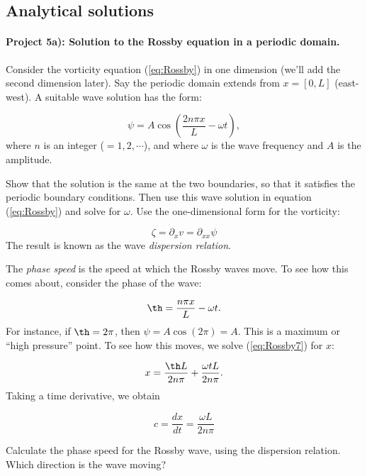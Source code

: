 \documentclass[%
oneside,                 %
final,                   %
10pt]{article}
\begin{document}
\subsection*{Analytical solutions}

\paragraph{Project 5a): Solution to the Rossby equation in a periodic domain.}
Consider the vorticity equation (\ref{eq:Rossby}) in one dimension
(we'll add the second dimension later). Say the periodic domain
extends from $x=[0,L]$ (east-west). A suitable wave solution has the
form:

\begin{equation}
  \label{eq:Rossby5}
	\psi = A \cos(\frac{2n\pi x}{L} - \omega t), 
\end{equation}
where $n$ is an integer ($=1,2,\cdots$), and where $\omega$ is the
wave frequency and $A$ is the amplitude.

Show that the solution is the same at the two boundaries, so that it
satisfies the periodic boundary conditions. Then use this wave solution
in equation (\ref{eq:Rossby}) and solve for $\omega$. Use the
one-dimensional form for the vorticity:

\begin{equation}
  \label{eq:Rossby6}
	\zeta = \partial_x v = \partial_{xx} \psi
\end{equation}
The result is known as the wave \emph{dispersion relation}.

The \emph{phase speed} is the speed at which the Rossby waves move. To see how this comes about, consider the phase of the wave:

\begin{equation}
  \label{eq:Rossby7}
	\th = \frac{n\pi x}{L} - \omega t.
\end{equation}
For instance, if $\th=2\pi$, then $\psi = A\cos(2\pi) = A$. This is a maximum or ``high pressure'' point. To see how this moves, we solve (\ref{eq:Rossby7}) for $x$:

\begin{equation}
	x = \frac{\th L}{2n\pi} + \frac{\omega tL}{2n\pi}.
\end{equation}
Taking a time derivative, we obtain

\begin{equation}
	c = \frac{dx}{dt} = \frac{\omega L}{2n\pi}
\end{equation}

Calculate the phase speed for the Rossby wave, using the dispersion relation. Which direction is the wave moving?
\end{document}

